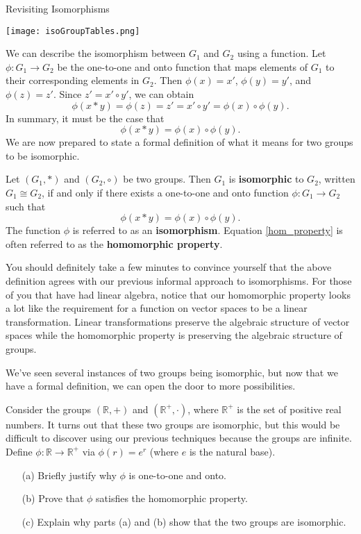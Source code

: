 \begin{section}{Revisiting Isomorphisms}
\begin{center}
\texttt{[image: isoGroupTables.png]}
\end{center}

We can describe the isomorphism between \(G_1\) and \(G_2\) using a function.  Let \(\phi:G_1\to G_2\) be the one-to-one and onto function that maps elements of \(G_1\) to their corresponding elements in \(G_2\).  Then \(\phi(x)=x'\), \(\phi(y)=y'\), and \(\phi(z)=z'\).  Since \(z'=x'\circ y'\), we can obtain
\[
\phi(x*y)=\phi(z)=z'=x'\circ y'=\phi(x)\circ \phi(y).
\]
In summary, it must be the case that 
\[
\phi(x*y)=\phi(x)\circ \phi(y).
\]
We are now prepared to state a formal definition of what it means for two groups to be isomorphic.

\begin{definition}\label{def:iso}
Let \((G_1,*)\) and \((G_2,\circ)\) be two groups.  Then \(G_1\) is \textbf{isomorphic} to \(G_2\), written \(G_1\cong G_2\), if and only if there exists a one-to-one and onto function \(\phi:G_1\to G_2\) such that
\begin{equation}\label{hom_property}
\phi(x*y)=\phi(x)\circ \phi(y).
\end{equation}
The function \(\phi\) is referred to as an \textbf{isomorphism}.  Equation \ref{hom_property} is often referred to as the \textbf{homomorphic property}.
\end{definition}

You should definitely take a few minutes to convince yourself that the above definition agrees with our previous informal approach to isomorphisms.  For those of you that have had linear algebra, notice that our homomorphic property looks a lot like the requirement for a function on vector spaces to be a linear transformation.  Linear transformations preserve the algebraic structure of vector spaces while the homomorphic property is preserving the algebraic structure of groups.

We've seen several instances of two groups being isomorphic, but now that we have a formal definition, we can open the door to more possibilities.

\begin{problem}
Consider the groups \((\mathbb{R},+)\) and \((\mathbb{R}^+,\cdot)\), where \(\mathbb{R}^+\) is the set of positive real numbers.  It turns out that these two groups are isomorphic, but this would be difficult to discover using our previous techniques because the groups are infinite.  Define \(\phi:\mathbb{R}\to \mathbb{R}^+\) via \(\phi(r)=e^r\) (where \(e\) is the natural base).
\begin{enumerate}
\item[(a)] Briefly justify why \(\phi\) is one-to-one and onto.
\item[(b)] Prove that \(\phi\) satisfies the homomorphic property.
\item[(c)] Explain why parts (a) and (b) show that the two groups are isomorphic.
\end{enumerate}
\end{problem}


\end{section}
